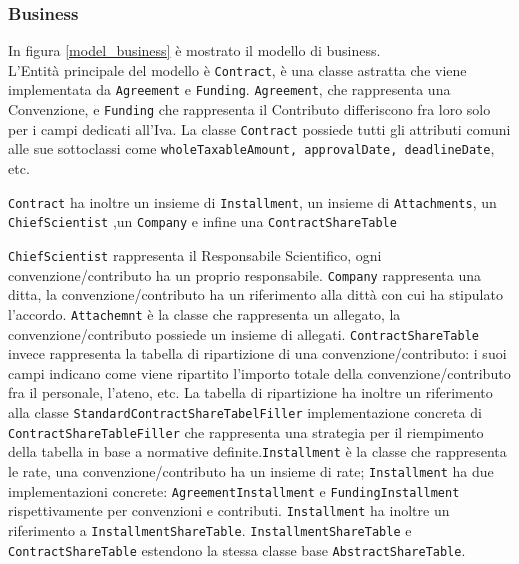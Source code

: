 \subsubsection{Business}

In figura \ref{model_business} è mostrato il modello di business. \\

L'Entità principale del modello è \texttt{Contract}, è una classe astratta che viene implementata da \texttt{Agreement} e \texttt{Funding}.
\texttt{Agreement}, che rappresenta una Convenzione, e \texttt{Funding} che rappresenta il Contributo differiscono fra loro solo per i campi dedicati all'Iva. La classe \texttt{Contract} possiede
tutti gli attributi comuni alle sue sottoclassi come \texttt{wholeTaxableAmount, approvalDate, deadlineDate}, etc.


\texttt{Contract} ha inoltre un insieme di \texttt{Installment}, un insieme di \texttt{Attachments}, un \texttt{ChiefScientist}
,un \texttt{Company} e infine una \texttt{ContractShareTable}

\texttt{ChiefScientist} rappresenta il Responsabile Scientifico, ogni convenzione/contributo ha un proprio responsabile.
\texttt{Company} rappresenta una ditta, la convenzione/contributo ha un riferimento alla dittà con cui ha stipulato l'accordo.
\texttt{Attachemnt} è la classe che rappresenta un allegato, la convenzione/contributo possiede un insieme di allegati.
\texttt{ContractShareTable} invece rappresenta la tabella di ripartizione di una convenzione/contributo: i suoi campi indicano come viene ripartito l'importo totale della convenzione/contributo fra il personale, l'ateno, etc.
La tabella di ripartizione ha inoltre un riferimento alla classe \texttt{StandardContractShareTabelFiller} implementazione concreta di \texttt{ContractShareTableFiller} che rappresenta una strategia per il riempimento della tabella in base
a normative definite.\texttt{Installment} è la classe che rappresenta le rate, una convenzione/contributo ha un insieme di rate; \texttt{Installment} ha due implementazioni concrete: \texttt{AgreementInstallment} e \texttt{FundingInstallment} rispettivamente
per convenzioni e contributi. \texttt{Installment} ha inoltre un riferimento a \texttt{InstallmentShareTable}. \texttt{InstallmentShareTable} e \texttt{ContractShareTable} estendono la stessa classe base \texttt{AbstractShareTable}.



